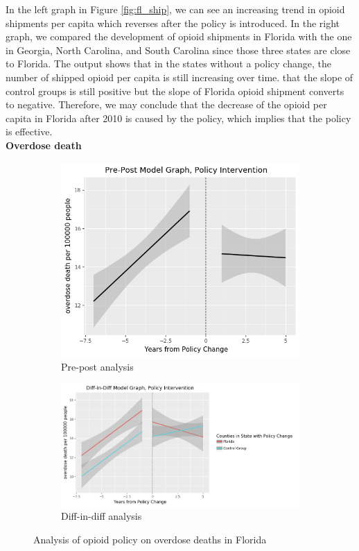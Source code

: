 \documentclass[12pt,letterpaper]{article}
\begin{document}
In the left graph in Figure \ref{fig:fl_ship}, we can see an increasing trend in opioid shipments per capita which reverses after the policy is introduced. In the right graph, we compared the development of opioid shipments in Florida with the one in Georgia, North Carolina, and South Carolina since those three states are close to Florida. The output shows that in the states without a policy change, the number of shipped opioid per capita is still increasing over time. that the slope of control groups is still positive but the slope of Florida opioid shipment converts to negative. Therefore, we may conclude that the decrease of the opioid per capita in Florida after 2010 is caused by the policy, which implies that the policy is effective. \\

\noindent \textbf{Overdose death} \\

\begin{figure}[!h]
\centering
\begin{subfigure}{.5\textwidth}
  \centering
  \includegraphics[width=0.7\linewidth]{../30_results/General_Results/florida_overdose_death_prepost.png}
  \caption{Pre-post analysis}
  \label{fig:fl_death_prepost}
\end{subfigure}%
\begin{subfigure}{.55\textwidth}
  \centering
  \includegraphics[width=1\linewidth]{../30_results/General_Results/florida_overdose_death_diffdiff.png}
  \caption{Diff-in-diff analysis}
  \label{fig:fl_death_did}
\end{subfigure}
\caption{Analysis of opioid policy on overdose deaths in Florida}
\label{fig:fl_death}
\end{figure}
\end{document}
